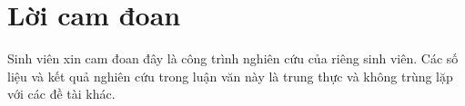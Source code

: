 \chapter*{Lời cam đoan}
\label{reassurances}

Sinh viên xin cam đoan đây là công trình nghiên cứu của riêng sinh viên. Các số liệu và kết quả nghiên cứu trong luận văn này là trung thực và không trùng lặp với các đề tài khác.